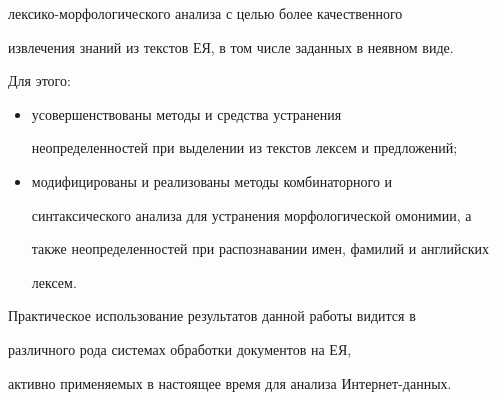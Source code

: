 лексико-мор\-фо\-ло\-ги\-че\-ско\-го анализа с целью более качественного 


извлечения знаний из текстов ЕЯ, в том числе заданных в неявном виде. 


Для этого: 


\begin{itemize} %


\item усовершенствованы  методы и средства  устранения 


неопределенностей при выделении из текстов лексем и предложений;


\item модифицированы  и реализованы  методы комбинаторного и 


синтаксического анализа для устранения морфологической омонимии, а 


также неопределенностей при распознавании имен, фамилий и английских 


лексем.  


\end{itemize}





Практическое использование результатов данной работы видится в 


различного рода системах обработки документов на ЕЯ, 


активно применяемых в настоящее время для анализа Интернет-данных.





